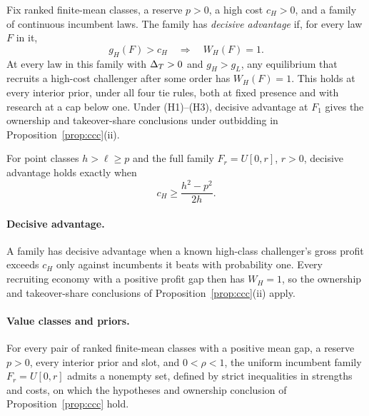 \begin{lemma}\label{lem:decisive}
Fix ranked finite-mean classes, a reserve \(p>0\), a high cost \(c_H>0\), and a family of continuous incumbent
laws. The family has \emph{decisive advantage} if, for every law \(F\) in it,
\[
g_H(F)>c_H\quad\Longrightarrow\quad W_H(F)=1.
\]
At every law in this family with \(\Delta_T>0\) and \(g_H>g_L\), any equilibrium that recruits a high-cost challenger
after some order has \(W_H(F)=1\). This holds at every interior prior, under all four tie rules, both at fixed
presence and with research at a cap below one. Under (H1)--(H3), decisive advantage at \(F_1\) gives the
ownership and takeover-share conclusions under outbidding in Proposition~\ref{prop:ccc}(ii).

For point classes \(h>\ell\ge p\) and the full family \(F_r=U[0,r]\), \(r>0\), decisive advantage holds exactly
when
\[
c_H\ge\frac{h^2-p^2}{2h}.
\]
\end{lemma}

\paragraph{Decisive advantage.}\label{par:decisive-main}
A family has decisive advantage when a known high-class challenger's gross profit exceeds \(c_H\) only against
incumbents it beats with probability one. Every recruiting economy with a positive profit gap then has
\(W_H=1\), so the ownership and takeover-share conclusions of Proposition~\ref{prop:ccc}(ii) apply.

\paragraph{Value classes and priors.}\label{par:uniform-classes-scope}
For every pair of ranked finite-mean classes with a positive mean gap, a reserve \(p>0\), every interior prior and slot, and
\(0<\rho<1\), the uniform incumbent family \(F_r=U[0,r]\) admits a nonempty set, defined by strict inequalities
in strengths and costs, on which the hypotheses and ownership conclusion of Proposition~\ref{prop:ccc} hold.

